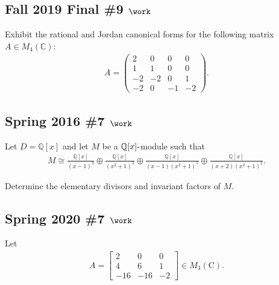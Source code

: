 \hypertarget{fall-2019-final-9-work}{%
\subsection{\texorpdfstring{Fall 2019 Final \#9
\(\work\)}{Fall 2019 Final \#9 \textbackslash work}}\label{fall-2019-final-9-work}}

Exhibit the rational and Jordan canonical forms for the following matrix
\(A\in M_4({\mathbb{C}})\):
\begin{align*}
  A=\left(\begin{array}{cccc}
  2 & 0 & 0 & 0 \\
  1 & 1 & 0 & 0 \\
  -2 & -2 & 0 & 1 \\
  -2 & 0 & -1 & -2
  \end{array}\right)
  .\end{align*}

\hypertarget{spring-2016-7-work}{%
\subsection{\texorpdfstring{Spring 2016 \#7
\(\work\)}{Spring 2016 \#7 \textbackslash work}}\label{spring-2016-7-work}}

Let \(D = {\mathbb{Q}}[x]\) and let \(M\) be a
\({\mathbb{Q}}[x]{\hbox{-}}\)module such that
\begin{align*}
M \cong \frac{\mathbb{Q}[x]}{(x-1)^{3}} \oplus \frac{\mathbb{Q}[x]}{\left(x^{2}+1\right)^{3}} \oplus \frac{\mathbb{Q}[x]}{(x-1)\left(x^{2}+1\right)^{5}} \oplus \frac{\mathbb{Q}[x]}{(x+2)\left(x^{2}+1\right)^{2}}
.\end{align*}

Determine the elementary divisors and invariant factors of \(M\).

\hypertarget{spring-2020-7-work}{%
\subsection{\texorpdfstring{Spring 2020 \#7
\(\work\)}{Spring 2020 \#7 \textbackslash work}}\label{spring-2020-7-work}}

Let
\begin{align*}
A=\left[\begin{array}{ccc}
2 & 0 & 0 \\
4 & 6 & 1 \\
-16 & -16 & -2
\end{array}\right] \in M_{3}(\mathrm{C})
.\end{align*}

